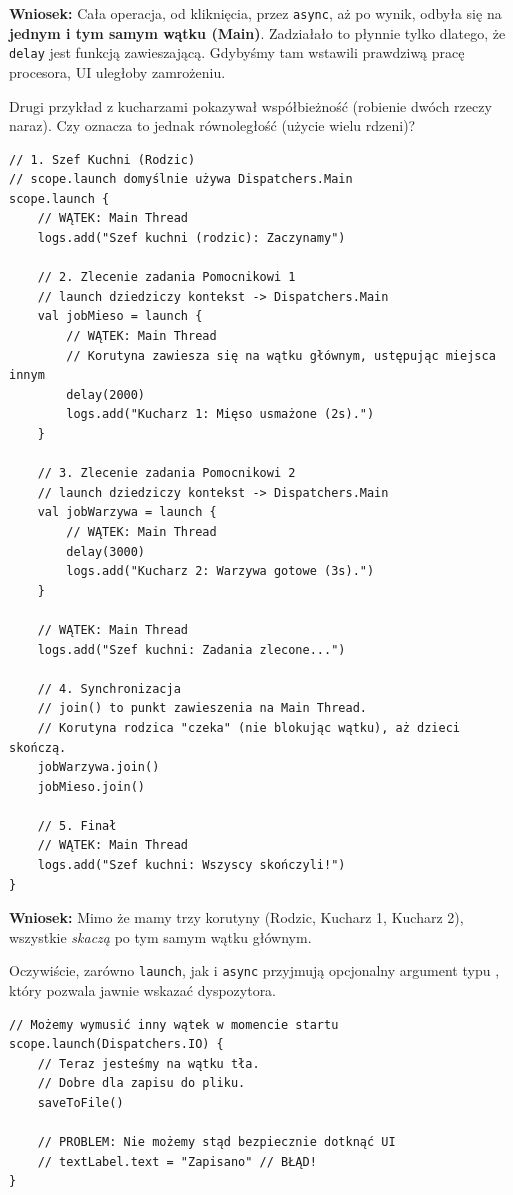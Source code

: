 \textbf{Wniosek:} Cała operacja, od kliknięcia, przez \texttt{async}, aż po wynik, odbyła się na \textbf{jednym i tym samym wątku (Main)}. Zadziałało to płynnie tylko dlatego, że \texttt{delay} jest funkcją zawieszającą. Gdybyśmy tam wstawili prawdziwą pracę procesora, UI uległoby zamrożeniu.

Drugi przykład z kucharzami pokazywał współbieżność (robienie dwóch rzeczy naraz). Czy oznacza to jednak równoległość (użycie wielu rdzeni)?

\begin{verbatim}
// 1. Szef Kuchni (Rodzic)
// scope.launch domyślnie używa Dispatchers.Main
scope.launch {
    // WĄTEK: Main Thread
    logs.add("Szef kuchni (rodzic): Zaczynamy")

    // 2. Zlecenie zadania Pomocnikowi 1
    // launch dziedziczy kontekst -> Dispatchers.Main
    val jobMieso = launch {
        // WĄTEK: Main Thread
        // Korutyna zawiesza się na wątku głównym, ustępując miejsca innym
        delay(2000) 
        logs.add("Kucharz 1: Mięso usmażone (2s).")
    }

    // 3. Zlecenie zadania Pomocnikowi 2
    // launch dziedziczy kontekst -> Dispatchers.Main
    val jobWarzywa = launch {
        // WĄTEK: Main Thread
        delay(3000) 
        logs.add("Kucharz 2: Warzywa gotowe (3s).")
    }

    // WĄTEK: Main Thread
    logs.add("Szef kuchni: Zadania zlecone...")

    // 4. Synchronizacja
    // join() to punkt zawieszenia na Main Thread.
    // Korutyna rodzica "czeka" (nie blokując wątku), aż dzieci skończą.
    jobWarzywa.join()
    jobMieso.join()

    // 5. Finał
    // WĄTEK: Main Thread
    logs.add("Szef kuchni: Wszyscy skończyli!")
}
\end{verbatim}

\textbf{Wniosek:} Mimo że mamy trzy korutyny (Rodzic, Kucharz 1, Kucharz 2), wszystkie \textit{skaczą} po tym samym wątku głównym.

Oczywiście, zarówno \texttt{launch}, jak i \texttt{async} przyjmują opcjonalny argument typu , który pozwala jawnie wskazać dyspozytora.

\begin{verbatim}
// Możemy wymusić inny wątek w momencie startu
scope.launch(Dispatchers.IO) {
    // Teraz jesteśmy na wątku tła.
    // Dobre dla zapisu do pliku.
    saveToFile()
    
    // PROBLEM: Nie możemy stąd bezpiecznie dotknąć UI
    // textLabel.text = "Zapisano" // BŁĄD!
}
\end{verbatim}

